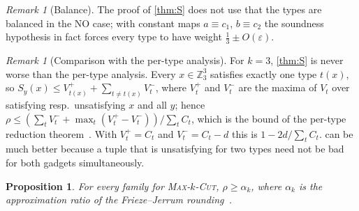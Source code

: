 \documentclass[11pt,letterpaper]{article}
\newtheorem{proposition}[theorem]{Proposition}
\theoremstyle{remark}
\newtheorem{remark}[theorem]{Remark}
\newcommand{\MC}[1]{\textup{\textsc{Max-$#1$-Cut}}}
\newcommand{\Z}{\mathbb{Z}}
\newcommand{\eps}{\varepsilon}
\begin{document}
\begin{remark}[Balance]\label{rem:balance}
The proof of \cref{thm:S} does not use that the types are balanced in the NO case; with constant maps
$a\equiv c_1$, $b\equiv c_2$ the soundness hypothesis in fact forces every type to have weight
$\frac13\pm O(\eps)$.
\end{remark}

\begin{remark}[Comparison with the per-type analysis]\label{rem:pertype}
For $k=3$, \cref{thm:S} is never worse than the per-type analysis. Every $x\in\Z_3^3$ satisfies exactly
one type $t(x)$, so $S_y(x)\le V^+_{t(x)}+\sum_{t\ne t(x)}V^-_t$, where $V^+_t$ and $V^-_t$ are the
maxima of $V_t$ over satisfying resp.\ unsatisfying $x$ and all $y$; hence
$\rho\le(\sum_tV^-_t+\max_t(V^+_t-V^-_t))/\sum_tC_t$, which is the bound of the per-type reduction
theorem~\cite[Thm.~C.2]{NRT25}. With $V^+_t=C_t$ and $V^-_t=C_t-d$ this is $1-2d/\sum_tC_t$.  can be much better because a tuple that is unsatisfying for two types need
not be bad for both gadgets simultaneously.
\end{remark}

\begin{proposition}\label{prop:alg}
For every family for \MC{k}, $\rho\ge\alpha_k$, where $\alpha_k$ is the approximation ratio of the
Frieze--Jerrum rounding~\cite{FJ97,dKPW04}.
\end{proposition}
\end{document}

